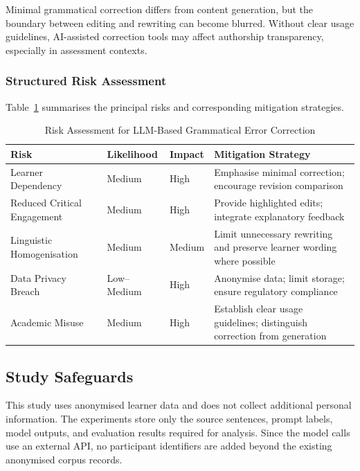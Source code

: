 Minimal grammatical correction differs from content generation, but the boundary between editing and rewriting can become blurred. Without clear usage guidelines, AI-assisted correction tools may affect authorship transparency, especially in assessment contexts.

\subsubsection*{Structured Risk Assessment}

Table~\ref{tab:risk_assessment} summarises the principal risks and corresponding mitigation strategies.

\begin{table}[htbp]
\centering
\caption{Risk Assessment for LLM-Based Grammatical Error Correction}
\label{tab:risk_assessment}
\begin{tabular}{|p{4cm}|p{3cm}|p{3cm}|p{4cm}|}
\hline
\textbf{Risk} & \textbf{Likelihood} & \textbf{Impact} & \textbf{Mitigation Strategy} \\
\hline
Learner Dependency & Medium & High & Emphasise minimal correction; encourage revision comparison \\
\hline
Reduced Critical Engagement & Medium & High & Provide highlighted edits; integrate explanatory feedback \\
\hline
Linguistic Homogenisation & Medium & Medium & Limit unnecessary rewriting and preserve learner wording where possible \\
\hline
Data Privacy Breach & Low--Medium & High & Anonymise data; limit storage; ensure regulatory compliance \\
\hline
Academic Misuse & Medium & High & Establish clear usage guidelines; distinguish correction from generation \\
\hline
\end{tabular}
\end{table}

\subsection{Study Safeguards}

This study uses anonymised learner data and does not collect additional personal information. The experiments store only the source sentences, prompt labels, model outputs, and evaluation results required for analysis. Since the model calls use an external API, no participant identifiers are added beyond the existing anonymised corpus records.

